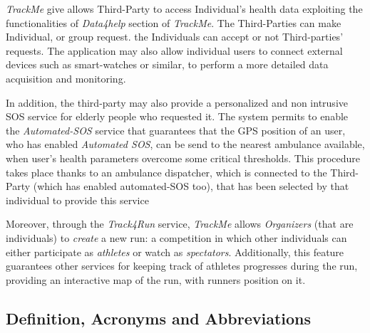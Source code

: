 \documentclass[a4paper]{article}
\begin{document}
   
   \textit{TrackMe} give allows Third-Party to access Individual's health data exploiting the functionalities of \textit{Data4help} section of \textit{TrackMe}. The Third-Parties can make Individual, or group request. the Individuals  can accept or not Third-parties' requests. The application may also allow individual users to connect external  devices such as smart-watches or similar, to perform a more detailed data acquisition and monitoring. 
   \newline
   
   
   In addition, the third-party may also provide a personalized and non intrusive SOS service for elderly people who requested it.
   The system permits to enable the \textit{Automated-SOS} service that guarantees that the GPS position of an user, who has enabled \textit{Automated SOS}, can be send to the nearest ambulance available, when user's health parameters overcome some critical thresholds. This procedure takes place thanks to an ambulance dispatcher, which is connected to the Third-Party (which has enabled automated-SOS too), that has been selected by that individual to provide this service
   \newline
   
   
   Moreover,  through  the \textit{Track4Run} service, \textit{TrackMe} allows \textit{Organizers} (that are individuals)  to  \textit{create}  a  new  run:  a  competition  in  which other individuals can either participate as \textit{athletes} or watch as \textit{spectators}.  Additionally, this feature guarantees other services for keeping track of athletes progresses during the run, providing an interactive map of the run, with runners position on it.

\subsection{Definition, Acronyms and  Abbreviations}
           
\end{document}
